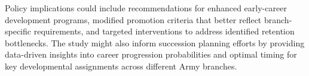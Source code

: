 \documentclass[main.tex]{subfiles}
\begin{document}
Policy implications could include recommendations for enhanced early-career development programs, modified promotion criteria that better reflect branch-specific requirements, and targeted interventions to address identified retention bottlenecks. The study might also inform succession planning efforts by providing data-driven insights into career progression probabilities and optimal timing for key developmental assignments across different Army branches.

\end{document}
